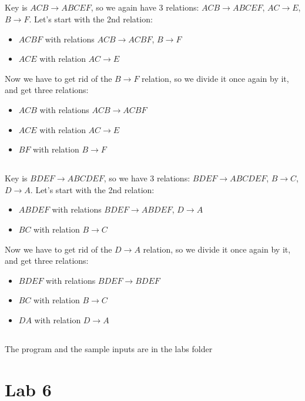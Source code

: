 \documentclass[a4paper]{article}
\begin{document}
\subsection{}
Key is $ACB \to ABCEF$, so we again have 3 relations: $ACB \to ABCEF$, $AC \to
E$, $B \to F$. Let's start with the 2nd relation:
\begin{itemize}
    \item $ACBF$ with relations $ACB \to ACBF$, $B \to F$
    \item $ACE$ with relation $AC \to E$
\end{itemize}
Now we have to get rid of the $B \to F$ relation, so we divide it once again by it, and get three relations:
\begin{itemize}
    \item $ACB$ with relations $ACB \to ACBF$
    \item $ACE$ with relation $AC \to E$
    \item $BF$ with relation $B \to F$
\end{itemize}
\subsection{}
Key is $BDEF \to ABCDEF$, so we have 3 relations: $BDEF \to ABCDEF$, $B \to
C$, $D \to A$. Let's start with the 2nd relation:
\begin{itemize}
    \item $ABDEF$ with relations $BDEF \to ABDEF$, $D \to A$
    \item $BC$ with relation $B \to C$
\end{itemize}
Now we have to get rid of the $D \to A$ relation, so we divide it once again by it, and get three relations:
\begin{itemize}
    \item $BDEF$ with relations $BDEF \to BDEF$
    \item $BC$ with relation $B \to C$
    \item $DA$ with relation $D \to A$
\end{itemize}
\subsection{}
The program and the sample inputs are in the labs folder
\section{Lab 6}
\end{document}
